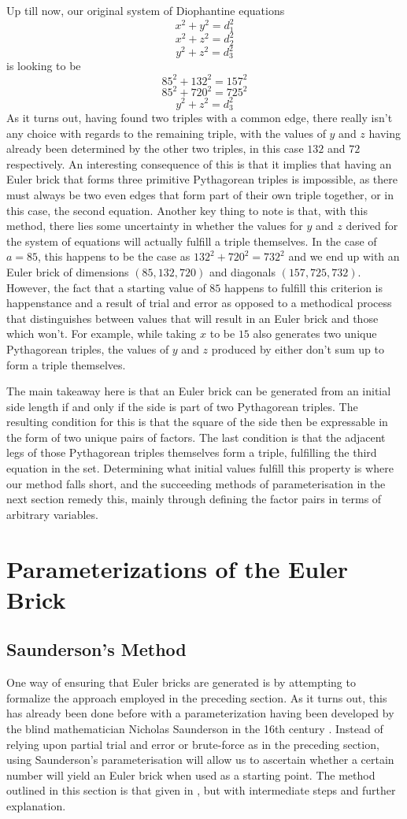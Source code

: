\documentclass[11pt]{article}
\begin{document}
Up till now, our original system of Diophantine equations
$$x^2+y^2=d_1^2$$
$$x^2+z^2=d_2^2$$
$$y^2+z^2=d_3^2$$
is looking to be
$$85^2+132^2=157^2$$
$$85^2+720^2=725^2$$
$$y^2+z^2=d_3^2$$
As it turns out, having found two triples with a common edge, there really isn't any choice with regards to the remaining triple, with the values of $y$ and $z$ having already been determined by the other two triples, in this case $132$ and $72$ respectively. An interesting consequence of this is that it implies that having an Euler brick that forms three primitive Pythagorean triples is impossible, as there must always be two even edges that form part of their own triple together, or in this case, the second equation. Another key thing to note is that, with this method, there lies some uncertainty in whether the values for $y$ and $z$ derived for the system of equations will actually fulfill a triple themselves. In the case of $a=85$, this happens to be the case as $132^2+720^2=732^2$ and we end up with an Euler brick of dimensions $(85, 132, 720)$ and diagonals $(157, 725, 732)$. However, the fact that a starting value of $85$ happens to fulfill this criterion is happenstance and a result of trial and error as opposed to a methodical process that distinguishes between values that will result in an Euler brick and those which won't. For example, while taking $x$ to be $15$ also generates two unique Pythagorean triples, the values of $y$ and $z$ produced by either don't sum up to form a triple themselves. 

The main takeaway here is that an Euler brick can be generated from an initial side length if and only if the side is part of two Pythagorean triples. The resulting condition for this is that the square of the side then be expressable in the form of two unique pairs of factors. The last condition is that the adjacent legs of those Pythagorean triples themselves form a triple, fulfilling the third equation in the set. Determining what initial values fulfill this property is where our method falls short, and the succeeding methods of parameterisation in the next section remedy this, mainly through defining the factor pairs in terms of arbitrary variables.
\section{Parameterizations of the Euler Brick}
\subsection{Saunderson's Method}
One way of ensuring that Euler bricks are generated is by attempting to formalize the approach employed in the preceding section. As it turns out, this has already been done before with a parameterization having been developed by the blind mathematician Nicholas Saunderson in the 16th century \cite[p. 429-431]{saunderson}. Instead of relying upon partial trial and error or brute-force as in the preceding section, using Saunderson's parameterisation will allow us to ascertain whether a certain number will yield an Euler brick when used as a starting point. The method outlined in this section is that given in \cite{saunderson}, but with intermediate steps and further explanation. 
\end{document}
